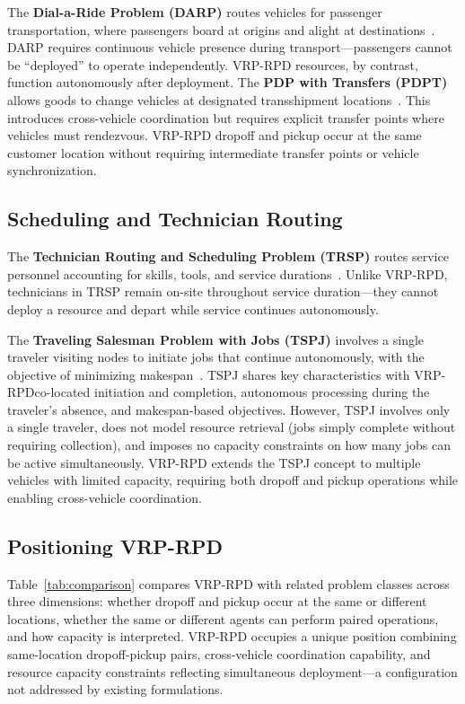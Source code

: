 \documentclass[sigconf]{acmart}
\begin{document}
The \textbf{Dial-a-Ride Problem (DARP)} routes vehicles for passenger transportation, where passengers board at origins and alight at destinations~\cite{cordeau2007darp, parragh2010variable}. DARP requires continuous vehicle presence during transport---passengers cannot be ``deployed'' to operate independently. VRP-RPD resources, by contrast, function autonomously after deployment. The \textbf{PDP with Transfers (PDPT)} allows goods to change vehicles at designated transshipment locations~\cite{masson2013pdpt}. This introduces cross-vehicle coordination but requires explicit transfer points where vehicles must rendezvous. VRP-RPD dropoff and pickup occur at the same customer location without requiring intermediate transfer points or vehicle synchronization.

\subsection{Scheduling and Technician Routing}

The \textbf{Technician Routing and Scheduling Problem (TRSP)} routes service personnel accounting for skills, tools, and service durations~\cite{kovacs2012adaptive, pillac2013technician}. Unlike VRP-RPD, technicians in TRSP remain on-site throughout service duration---they cannot deploy a resource and depart while service continues autonomously.

The \textbf{Traveling Salesman Problem with Jobs (TSPJ)} involves a single traveler visiting nodes to initiate jobs that continue autonomously, with the objective of minimizing makespan~\cite{mosayebi2021traveling}. TSPJ shares key characteristics with VRP-RPD\textemdash co-located initiation and completion, autonomous processing during the traveler's absence, and makespan-based objectives. However, TSPJ involves only a single traveler, does not model resource retrieval (jobs simply complete without requiring collection), and imposes no capacity constraints on how many jobs can be active simultaneously. VRP-RPD extends the TSPJ concept to multiple vehicles with limited capacity, requiring both dropoff and pickup operations while enabling cross-vehicle coordination.

\subsection{Positioning VRP-RPD}

Table~\ref{tab:comparison} compares VRP-RPD with related problem classes across three dimensions: whether dropoff and pickup occur at the same or different locations, whether the same or different agents can perform paired operations, and how capacity is interpreted. VRP-RPD occupies a unique position combining same-location dropoff-pickup pairs, cross-vehicle coordination capability, and resource capacity constraints reflecting simultaneous deployment---a configuration not addressed by existing formulations.
\end{document}

